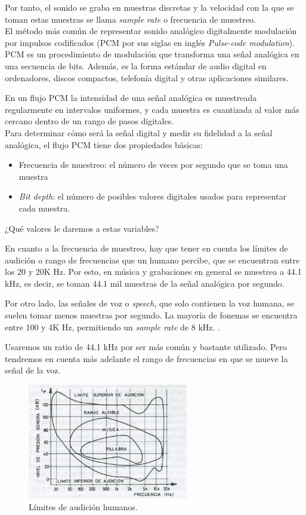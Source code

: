 Por tanto, el sonido se graba en muestras discretas y la velocidad con la que se toman estas muestras se llama \emph{sample rate} o frecuencia de muestreo. \\

El método más común de representar sonido analógico digitalmente modulación por impulsos codificados (PCM por sus siglas en inglés \emph{Pulse-code modulation}\cite{REF}). %
PCM es un procedimiento de modulación que transforma una señal analógica en una secuencia de bits. Además, es la forma estándar de audio digital en ordenadores, discos compactos, telefonía digital y otras aplicaciones similares. \cite{REF}%
 
 En un flujo PCM la intensidad de una señal analógica es muestreada regularmente en intervalos uniformes, y cada muestra es cuantizada al valor más cercano dentro de un rango de pasos digitales. \\

Para determinar cómo será la señal digital y medir su fidelidad a la señal analógica, el flujo PCM tiene dos propiedades básicas:
\begin{itemize}
\item Frecuencia de muestreo: el número de veces por segundo que se toma una muestra
\item \emph{Bit depth}: el número de posibles valores digitales usados para representar cada muestra. 
\end{itemize}

¿Qué valores le daremos a estas variables?

En cuanto a la frecuencia de muestreo, hay que tener en cuenta los límites de audición o rango de frecuencias que un humano percibe, que se encuentran entre los 20 y 20K Hz. Por esto, en música y grabaciones en general se muestrea a 44.1 kHz, es decir, se toman 44.1 mil muestras de la señal analógica por segundo.

Por otro lado, las señales de voz o \emph{speech}, que solo contienen la voz humana, se suelen tomar menos muestras por segundo. La mayoría de fonemas se encuentra entre 100 y 4K Hz, permitiendo un \emph{sample rate} de 8 kHz.  \cite{REF}.%

Usaremos un ratio de 44.1 kHz por ser más común y bastante utilizado. Pero tendremos en cuenta más adelante el rango de frecuencias en que se mueve la señal de la voz. \\

\begin{figure}[th]
\centering
\includegraphics[width=7cm]{Figures/LimAudicion}
\decoRule
\caption[LimAudicion]{Límites de audición humanos.}
\label{fig:limAudicion}
\end{figure}

